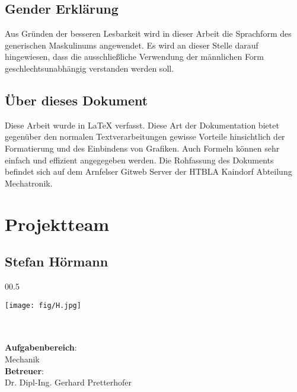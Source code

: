 \newpage
\thispagestyle{empty}
\mbox{}

\clearpage

\subsection*{Gender Erklärung}
\label{sec:gender-erklaerung}
Aus Gründen der besseren Lesbarkeit wird in dieser Arbeit die Sprachform des generischen Maskulinums angewendet. Es wird an dieser Stelle darauf hingewiesen, dass die ausschließliche Verwendung der männlichen Form geschlechtsunabhängig verstanden werden soll.

\subsection*{Über dieses Dokument}
\label{sec:ueber-dokument}
Diese Arbeit wurde in \LaTeX{} verfasst. Diese Art der Dokumentation bietet gegenüber den normalen Textverarbeitungen gewisse Vorteile hinsichtlich der Formatierung und des Einbindens von Grafiken. Auch Formeln können sehr einfach und effizient angegegeben werden. Die Rohfassung des Dokuments befindet sich auf dem Arnfelser Gitweb Server der HTBLA Kaindorf Abteilung Mechatronik.

\clearpage

\newpage
\thispagestyle{empty}
\mbox{}

\clearpage

\section*{Projektteam}
\label{sec:projektteam}

\subsection*{Stefan Hörmann}
\begin{wrapfigure}[10]{0}{0.5\textwidth}
\begin{center}
  \texttt{[image: fig/H.jpg]}
\end{center}
\end{wrapfigure}
\mbox{}\\
\mbox{}\\
\textbf{Aufgabenbereich}:\\
Mechanik\\
\textbf{Betreuer}:\\
Dr. Dipl-Ing. Gerhard Pretterhofer
\mbox{}\\
\mbox{}\\
\mbox{}\\
\mbox{}\\
\mbox{}\\
\mbox{}\\

